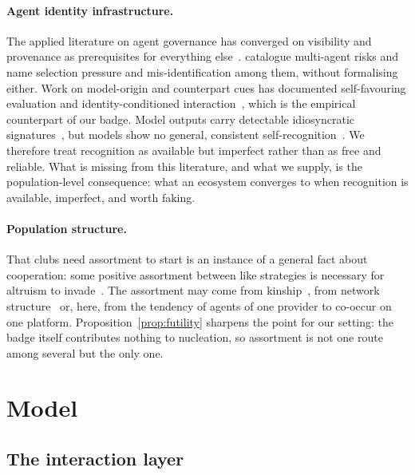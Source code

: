 \documentclass[11pt,a4paper]{article}
\theoremstyle{definition}
\begin{document}
\paragraph{Agent identity infrastructure.}
The applied literature on agent governance has converged on visibility and
provenance as prerequisites for everything
else~\citep{chan2024visibility,chan2025infrastructure,shavit2023practices,kolt2025governing}.
\citet{hammond2025multiagent} catalogue multi-agent risks and name selection
pressure and mis-identification among them, without formalising either. Work on
model-origin and counterpart cues has documented self-favouring evaluation and
identity-conditioned
interaction~\citep{panickssery2024llm,long2025mirror,wang2026outgroup}, which is
the empirical counterpart of our badge. Model outputs carry detectable
idiosyncratic signatures~\citep{sun2025idiosyncrasies}, but models show no
general, consistent self-recognition~\citep{davidson2024self}. We therefore
treat recognition as available but imperfect rather than as free and reliable.
What is missing from this literature, and what we supply, is the
population-level consequence: what an ecosystem converges to when recognition
is available, imperfect, and worth faking.

\paragraph{Population structure.}
That clubs need assortment to start is an instance of a general fact about
cooperation: some positive assortment between like strategies is necessary for
altruism to invade~\citep{eshel1982assortment,fletcher2009simple}. The
assortment may come from
kinship~\citep{hamilton1964genetical1,hamilton1964genetical2}, from network
structure~\citep{ohtsuki2006simple,santos2005scale} or, here, from the
tendency of agents of one provider to co-occur on one platform.
Proposition~\ref{prop:futility} sharpens the point for our setting: the badge
itself contributes nothing to nucleation, so assortment is not one route among
several but the only one.

\section{Model}
\label{sec:model}

\subsection{The interaction layer}
\label{sec:race}
\end{document}
